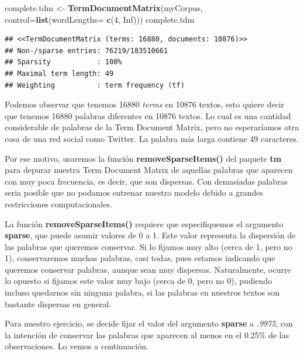 \documentclass[]{article}
\newenvironment{Shaded}{\begin{snugshade}}{\end{snugshade}}
\newcommand{\DataTypeTok}[1]{\textcolor[rgb]{0.13,0.29,0.53}{#1}}
\newcommand{\DecValTok}[1]{\textcolor[rgb]{0.00,0.00,0.81}{#1}}
\newcommand{\KeywordTok}[1]{\textcolor[rgb]{0.13,0.29,0.53}{\textbf{#1}}}
\newcommand{\NormalTok}[1]{#1}
\newcommand{\OtherTok}[1]{\textcolor[rgb]{0.56,0.35,0.01}{#1}}
\newcommand{\StringTok}[1]{\textcolor[rgb]{0.31,0.60,0.02}{#1}}
\begin{document}
\begin{Shaded}
\begin{Highlighting}[]
\NormalTok{complete.tdm <-}\StringTok{ }\KeywordTok{TermDocumentMatrix}\NormalTok{(myCorpus, }\DataTypeTok{control=}\KeywordTok{list}\NormalTok{(}\DataTypeTok{wordLengths=} \KeywordTok{c}\NormalTok{(}\DecValTok{4}\NormalTok{, }\OtherTok{Inf}\NormalTok{)))}
\NormalTok{complete.tdm}
\end{Highlighting}
\end{Shaded}

\begin{verbatim}
## <<TermDocumentMatrix (terms: 16880, documents: 10876)>>
## Non-/sparse entries: 76219/183510661
## Sparsity           : 100%
## Maximal term length: 49
## Weighting          : term frequency (tf)
\end{verbatim}

Podemos observar que tenemos 16880 \emph{terms} en 10876 textos, esto quiere decir que
tenemos 16880 palabras diferentes en 10876 textos. Lo cual es una
cantidad considerable de palabras de la Term Document Matrix, pero no esperaríamos otra cosa de
una red social como Twitter. La palabra más larga contiene 49 caracteres.

Por ese motivo, usaremos la función \textbf{removeSparseItems()} del paquete \textbf{tm} para depurar nuestra
Term Document Matrix de aquellas palabras que aparecen con muy poca frecuencia, es decir, que son dispersas. Con demasiadas palabras seria posible que no podamos entrenar nuestro modelo debido a grandes restricciones computacionales.

La función \textbf{removeSparseItems()} requiere que especifiquemos el argumento \textbf{sparse}, que puede asumir valores de 0 a 1. Este valor representa la dispersión de las palabras que queremos conservar. Si lo fijamos muy alto (cerca de 1, pero no 1), conservaremos muchas palabras, casi todas, pues estamos
indicando que queremos conservar palabras, aunque sean muy dispersas. Naturalmente, ocurre lo opuesto si fijamos este valor muy bajo (cerca de 0, pero no 0), pudiendo incluso quedarnos sin ninguna palabra, si las palabras en nuestros textos son bastante dispersas en general.

Para nuestro ejercicio, se decide fijar el valor del argumento \textbf{sparse} a \emph{.9975}, con la intención de conservar las palabras que aparecen al menos en el 0.25\% de las observaciones. Lo vemos a continuación.

\vspace{3mm}
\end{document}
